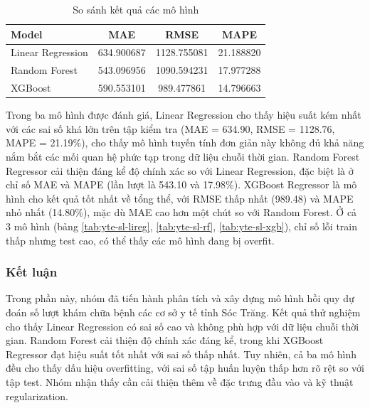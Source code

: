     \begin{table}[htbp]
        \centering
        \caption{So sánh kết quả các mô hình}
        \label{tab:yte-sl-compare}
        \begin{tabular}{|l|c|c|c|}
        \hline
        Model & MAE & RMSE & MAPE \\
        \hline
        Linear Regression & 634.900687 & 1128.755081 & 21.188820 \\
        \hline
        Random Forest & 543.096956 & 1090.594231 & 17.977288 \\
        \hline
        XGBoost & 590.553101 & 989.477861 & 14.796663 \\
        \hline
        \end{tabular}
    \end{table}

    \FloatBarrier

    Trong ba mô hình được đánh giá, Linear Regression cho thấy hiệu suất kém nhất với các sai số khá lớn trên tập kiểm tra (MAE = 634.90, RMSE = 1128.76, MAPE = 21.19\%), cho thấy mô hình tuyến tính đơn giản này không đủ khả năng nắm bắt các mối quan hệ phức tạp trong dữ liệu chuỗi thời gian. Random Forest Regressor cải thiện đáng kể độ chính xác so với Linear Regression, đặc biệt là ở chỉ số MAE và MAPE (lần lượt là 543.10 và 17.98\%). XGBoost Regressor là mô hình cho kết quả tốt nhất về tổng thể, với RMSE thấp nhất (989.48) và MAPE nhỏ nhất (14.80\%), mặc dù MAE cao hơn một chút so với Random Forest. Ở cả 3 mô hình (bảng \ref{tab:yte-sl-lireg}, \ref{tab:yte-sl-rf}, \ref{tab:yte-sl-xgb}), chỉ số lỗi train thấp nhưng test cao, có thể thấy các mô hình đang bị overfit.

\subsubsection{Kết luận}
    Trong phần này, nhóm đã tiến hành phân tích và xây dựng mô hình hồi quy dự đoán số lượt khám chữa bệnh các cơ sở y tế tỉnh Sóc Trăng. Kết quả thử nghiệm cho thấy Linear Regression có sai số cao và không phù hợp với dữ liệu chuỗi thời gian. Random Forest cải thiện độ chính xác đáng kể, trong khi XGBoost Regressor đạt hiệu suất tốt nhất với sai số thấp nhất. Tuy nhiên, cả ba mô hình đều cho thấy dấu hiệu overfitting, với sai số tập huấn luyện thấp hơn rõ rệt so với tập test. Nhóm nhận thấy cần cải thiện thêm về đặc trưng đầu vào và kỹ thuật regularization.